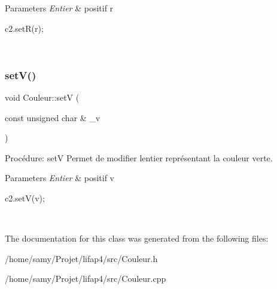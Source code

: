 \begin{DoxyParams}{Parameters}
{\em Entier} & positif r 
\begin{DoxyCode}
c2.setR(r);
\end{DoxyCode}
 \\
\hline
\end{DoxyParams}
\mbox{\label{classCouleur_a7aa9a8ce100008ef3551064b1c7bfe47}} 
\subsubsection{\texorpdfstring{set\+V()}{setV()}}
{\footnotesize\ttfamily void Couleur\+::setV (\begin{DoxyParamCaption}\item[{const unsigned char \&}]{\+\_\+v }\end{DoxyParamCaption})}



Procédure\+: setV Permet de modifier l\textquotesingle{}entier représentant la couleur verte. 


\begin{DoxyParams}{Parameters}
{\em Entier} & positif v 
\begin{DoxyCode}
c2.setV(v);
\end{DoxyCode}
 \\
\hline
\end{DoxyParams}


The documentation for this class was generated from the following files\+:\begin{DoxyCompactItemize}
\item 
/home/samy/\+Projet/lifap4/src/Couleur.\+h\item 
/home/samy/\+Projet/lifap4/src/Couleur.\+cpp\end{DoxyCompactItemize}
